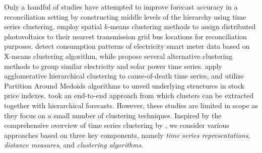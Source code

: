 \documentclass[a4paper,review,12pt,authoryear]{elsarticle}
\begin{document}



{\color{purple}Only a handful of studies have attempted to improve forecast accuracy in a reconciliation setting by constructing middle levels of the hierarchy using time series clustering. \cite{yang2017reconciling} employ spatial $k$-means clustering methods to assign distributed photovoltaics  to their nearest transmission grid bus locations for reconciliation purposes.} \cite{pangHierarchicalElectricityTime2018} detect consumption patterns of electricity smart meter data based on X-means clustering algorithm, while \cite{pangHierarchicalElectricityTime2022} propose several alternative clustering methods to group similar electricity and solar power time series. 
\cite{liForecastReconciliationApproach2019} apply agglomerative hierarchical clustering to cause-of-death time series, and
\cite{matteraImprovingOutofSampleForecasts2023} utilize Partition Around Medoids algorithms to unveil underlying structures in stock price indexes. {\color{purple} \cite{cini2023graph} took an end-to-end approach from which clusters can be extracted together with hierarchical forecasts.} 
However, these studies are limited in scope as they focus on a small number of  clustering techniques. 
Inspired by the comprehensive overview of time series clustering by \cite{aghabozorgiTimeseriesClusteringDecade2015a}, we consider various approaches based on three key components, namely \textit{time series representations}, \textit{distance measures}, and \textit{clustering algorithms}. %
\end{document}
